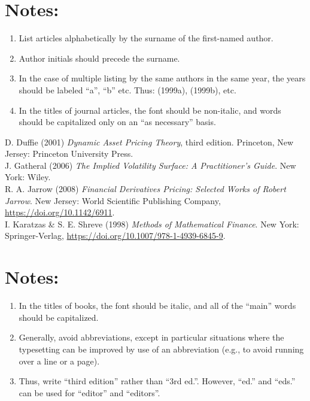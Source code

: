 \documentclass{ws-ijtaf}
\begin{document}
\section*{Notes:}
\begin{enumerate}[4.]
\item[1.] List articles alphabetically by the surname of the first-named author.

\item[2.] Author initials should precede the surname.

\item[3.] In the case of multiple listing by the same authors in the same year, the years should be labeled ``a'', ``b'' etc. Thus: (1999a), (1999b), etc.

\item[4.] In the titles of journal articles, the font should be non-italic, and words should be capitalized only on an ``as necessary'' basis.
\end{enumerate}

\noindent D. Duffie (2001) {\it Dynamic Asset Pricing Theory}, third edition.
Princeton, New Jersey: Princeton University Press.\\[2pt]

\noindent J. Gatheral (2006) {\it The Implied Volatility Surface: A Practitioner's Guide}. New York: Wiley.\\[2pt]

\noindent R. A. Jarrow (2008) {\it Financial Derivatives Pricing: Selected Works of Robert Jarrow}. New Jersey: World Scientific Publishing Company, \url{https://doi.org/10.1142/6911}.\\[2pt]

\noindent I. Karatzas \& S. E. Shreve (1998) {\it Methods of Mathematical Finance}. New York: Springer-Verlag, \url{https://doi.org/10.1007/978-1-4939-6845-9}.

\section*{Notes:}
\begin{enumerate}[4.]
\item[1.] In the titles of books, the font should be italic, and all of the ``main'' words should be capitalized.

\item[2.] Generally, avoid abbreviations, except in particular situations where the typesetting can be improved by use of an abbreviation (e.g., to avoid running over a line or a page).

\item[3.] Thus, write ``third edition'' rather than ``3rd ed.''. However, ``ed.'' and ``eds.'' can be used for
``editor'' and ``editors''.
\end{enumerate}
\end{document}
